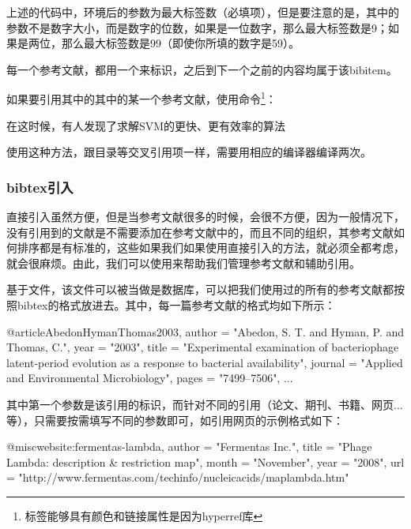     上述的代码中，环境后的参数为最大标签数（必填项），但是要注意的是，其中的参数不是数字大小，而是数字的位数，如果是一位数字，那么最大标签数是9；如果是两位，那么最大标签数是99（即使你所填的数字是59）。

    每一个参考文献，都用一个来标识，之后到下一个之前的内容均属于该bibitem。

    如果要引用其中的其中的某一个参考文献，使用命令\footnote{标签能够具有颜色和链接属性是因为hyperref库}：
    \begin{texshow}
        在这时候，有人发现了求解SVM的更快、更有效率的算法\cite{SMOalgo}
    \end{texshow}

    使用这种方法，跟目录等交叉引用项一样，需要用相应的编译器编译两次。

    \subsubsection{bibtex引入}

    直接引入虽然方便，但是当参考文献很多的时候，会很不方便，因为一般情况下，没有引用到的文献是不需要添加在参考文献中的，而且不同的组织，其参考文献如何排序都是有标准的，这些如果我们如果使用直接引入的方法，就必须全都考虑，就会很麻烦。由此，我们可以使用来帮助我们管理参考文献和辅助引用。

    基于文件，该文件可以被当做是数据库，可以把我们使用过的所有的参考文献都按照bibtex的格式放进去。其中，每一篇参考文献的格式均如下所示：
    \begin{texcode}
        @article{AbedonHymanThomas2003,
            author = "Abedon, S. T. and Hyman, P. and Thomas, C.",
            year = "2003",
            title = "Experimental examination of bacteriophage latent-period evolution as a response to bacterial availability",
            journal = "Applied and Environmental Microbiology",
            pages = "7499--7506",
            ...
        }
    \end{texcode}
    其中第一个参数是该引用的标识，而针对不同的引用（论文、期刊、书籍、网页...等），只需要按需填写不同的参数即可，如引用网页的示例格式如下：
    \begin{texcode}
        @misc{website:fermentas-lambda,
            author = "Fermentas Inc.",
            title = "Phage Lambda: description \& restriction map",
            month = "November",
            year = "2008",
            url = "http://www.fermentas.com/techinfo/nucleicacids/maplambda.htm"
        }
    \end{texcode}

